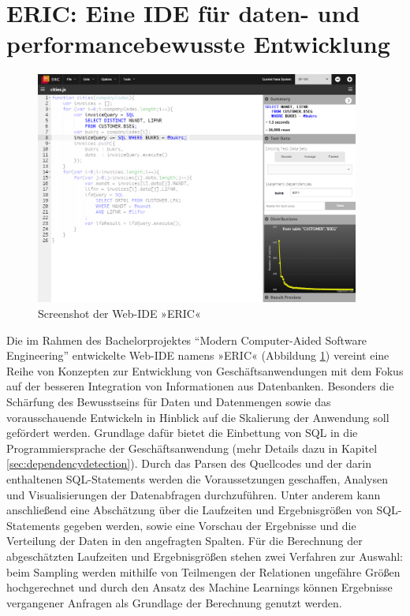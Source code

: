 \section{ERIC: Eine IDE f{\"u}r daten- und performancebewusste Entwicklung}\label{chap:entwicklungsumgebung}

%
%


\begin{figure}[ht]
	\centering
  \includegraphics[width=0.95\textwidth]{figures/ide.png}
	\caption{Screenshot der Web-IDE »ERIC«}
	\label{fig:ide}
\end{figure}

Die im Rahmen des Bachelorprojektes ``Modern Computer-Aided Software Engineering'' entwickelte Web-IDE namens »ERIC« (Abbildung \ref{fig:ide}) vereint eine Reihe von Konzepten zur Entwicklung von Geschäftsanwendungen mit dem Fokus auf der besseren Integration von Informationen aus Datenbanken.
Besonders die Schärfung des Bewusstseins für Daten und Datenmengen sowie das vorausschauende Entwickeln in Hinblick auf die Skalierung der Anwendung soll gefördert werden.
Grundlage dafür bietet die Einbettung von SQL in die Programmiersprache der Geschäftsanwendung \cite{Horschig2014} (mehr Details dazu in Kapitel \ref{sec:dependencydetection}).
Durch das Parsen des Quellcodes \cite{Horschig2014} und der darin enthaltenen SQL-Statements \cite{Schulz2014} werden die Voraussetzungen geschaffen, Analysen und Visualisierungen der Datenabfragen durchzuführen.
Unter anderem kann anschließend eine Abschätzung über die Laufzeiten und Ergebnisgrößen von SQL-Statements gegeben werden, sowie eine Vorschau der Ergebnisse und die Verteilung der Daten in den angefragten Spalten.
Für die Berechnung der abgeschätzten Laufzeiten und Ergebnisgrößen stehen zwei Verfahren zur Auswahl: beim Sampling \cite{Exner2014} werden mithilfe von Teilmengen der Relationen ungefähre Größen hochgerechnet und durch den Ansatz des Machine Learnings \cite{Mues2014} können Ergebnisse vergangener Anfragen als Grundlage der Berechnung genutzt werden.

